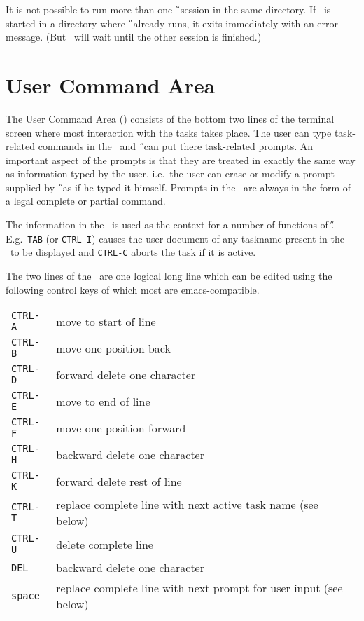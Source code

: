 It is not possible to run more than one \G\ session in the same directory.
If \tH\ is started in a directory where \G\ already runs, it exits
immediately with an error message.
(But \nH\ will wait until the other session is finished.)

\section{User Command Area}
The User Command Area (\UCA ) consists of the bottom two lines of the terminal
screen where most interaction with the tasks takes place.
The user can type task-related commands in the \UCA\ and \H\ can put there
task-related prompts.
An important aspect of the prompts is that they
are treated in exactly the same way as information typed by the user, i.e.\ the
user can erase or modify a prompt supplied by \H\ as if he typed it himself.
Prompts in the \UCA\ are always in the form of a legal complete or partial
command.

The information in the \UCA\ is used as the context for a number of functions of
\H.
E.g.\ {\tt TAB} (or {\tt CTRL-I}) causes the user document of any taskname
present in the
\UCA\ to be displayed and {\tt CTRL-C} aborts the task if it is active.

The two lines of the \UCA\ are one logical long line which can be edited using
the following control keys of which most are {\sc emacs}-compatible.

\label{ctrla}\label{ctrlb}\label{ctrld}\label{ctrle}\label{ctrlf}
\label{ctrlk}\label{ctrlt}\label{ctrlu}
\begin{tabular}{ll}
{\tt CTRL-A}&move to start of line\\
{\tt CTRL-B}&move one position back\\
{\tt CTRL-D}&forward delete one character\\
{\tt CTRL-E}&move to end of line\\
{\tt CTRL-F}&move one position forward\\
{\tt CTRL-H}&backward delete one character\\
{\tt CTRL-K}&forward delete rest of line\\
{\tt CTRL-T}&replace complete line with next active task name (see below)\\
{\tt CTRL-U}&delete complete line\\
{\tt DEL}&backward delete one character\\
{\tt space}&replace complete line with next prompt for user input (see below)\\
\end{tabular}


